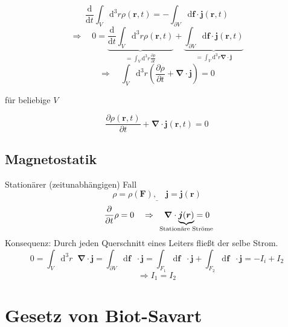 \documentclass[titlepage,11pt,a4paper,ngerman]{report}
\newcommand{\difi}[1]{\mathrm{d}#1\mathop{}\!}
\newcommand{\tx}[1]{\textrm{#1}}
\newcommand{\ub}[1]{\underbrace{#1}}
\newcommand{\dd}{\tx{d}}
\newcommand{\prt}[2]{\frac{\partial #1}{\partial #2}}
\newcommand{\prd}[2]{\frac{\tx{d} #1}{\tx{d} #2}}
\renewcommand{\vec}[1]{\boldsymbol{#1}}
\newcommand{\vabla}{\boldsymbol{\nabla}}
\newcommand{\frbox}[2]{\begin{tcolorbox}[colback=white,colframe=red!75!black,fonttitle=\bfseries,title=#1]#2\end{tcolorbox}}
\begin{document}
\begin{minipage}{.65\linewidth}
	\begin{equation*}
	\prd{}{t} \int_V \dd^3 r \rho(\vec{r},t) = - \int_{\partial V} \dd \vec{f} \cdot \vec{j}(\vec{r},t)
	\end{equation*}
	\begin{equation*}
	\Rightarrow \quad 0 = \ub{\prd{}{t} \int_V \dd ^3 r \rho(\vec{r},t)}_{=\int_V \dd^3 r \prt{\rho}{t}} + \ub{\int_{\partial V} \dd \vec{f} \cdot \vec{j}(\vec{r},t)}_{=\int_V \dd^3 r \vabla \cdot \vec{j}}
	\end{equation*}
	\begin{equation*}
	\Rightarrow \quad \int_V \dd^3 r \left(\prt{\rho}{t} + \vabla \cdot \vec{j}\right) = 0
	\end{equation*}
\end{minipage}%

\noindent
für beliebige $ V $
\frbox{Kontinuitätsgleichung}{
\begin{equation*}
\prt{\rho(\vec{r},t)}{t} + \vabla \cdot \vec{j}(\vec{r},t) = 0
\end{equation*}
}

\subsection{Magnetostatik}

Stationärer (zeitunabhängigen) Fall
$$\underline{\rho = \rho(\vec{F}), \quad \vec{j} = \vec{j}(\vec{r})}$$
$$\prt{}{t}\rho = 0 \quad \Rightarrow \quad \vabla \cdot \underbrace{\vec{j}(\vec{r})}_{\mathclap{\textrm{Stationäre Ströme}}} = 0$$
Konsequenz: Durch jeden Querschnitt eines Leiters fließt der selbe Strom.
$$0 = \int_V \difi{^3 r} \vabla\cdot\vec{j} = \int_{\partial V} \difi{\vec{f}} \cdot \vec{j} = \int_{F_1} \difi{\vec{f}} \cdot \vec{j} + \int_{F_2}\difi{\vec{f}} \cdot \vec{j} = -I_i + I_2$$
$$\Rightarrow I_1 = I_2$$


\section{Gesetz von Biot-Savart}
\end{document}
